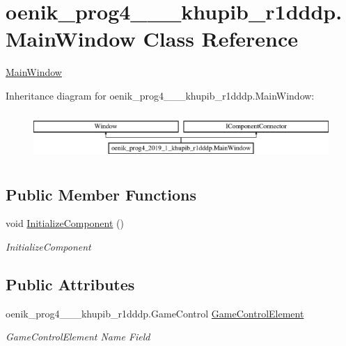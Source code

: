 \hypertarget{classoenik__prog4__2019__1__khupib__r1dddp_1_1_main_window}{}\section{oenik\+\_\+prog4\+\_\+\_\+\_\+khupib\+\_\+r1dddp.\+Main\+Window Class Reference}
\label{classoenik__prog4__2019__1__khupib__r1dddp_1_1_main_window}


\mbox{\hyperlink{classoenik__prog4__2019__1__khupib__r1dddp_1_1_main_window}{Main\+Window}}  


Inheritance diagram for oenik\+\_\+prog4\+\_\+\_\+\_\+khupib\+\_\+r1dddp.\+Main\+Window\+:\begin{figure}[H]
\begin{center}
\leavevmode
\includegraphics[height=1.830065cm]{classoenik__prog4__2019__1__khupib__r1dddp_1_1_main_window}
\end{center}
\end{figure}
\subsection*{Public Member Functions}
\begin{DoxyCompactItemize}
\item 
void \mbox{\hyperlink{classoenik__prog4__2019__1__khupib__r1dddp_1_1_main_window_a24ef01ec3e9b5d7f394073678d3bb805}{Initialize\+Component}} ()
\begin{DoxyCompactList}\small\item\em Initialize\+Component \end{DoxyCompactList}\end{DoxyCompactItemize}
\subsection*{Public Attributes}
\begin{DoxyCompactItemize}
\item 
oenik\+\_\+prog4\+\_\+\_\+\_\+khupib\+\_\+r1dddp.\+Game\+Control \mbox{\hyperlink{classoenik__prog4__2019__1__khupib__r1dddp_1_1_main_window_a4181e23ac6b29853336805b54792c8aa}{Game\+Control\+Element}}
\begin{DoxyCompactList}\small\item\em Game\+Control\+Element Name Field \end{DoxyCompactList}\end{DoxyCompactItemize}


